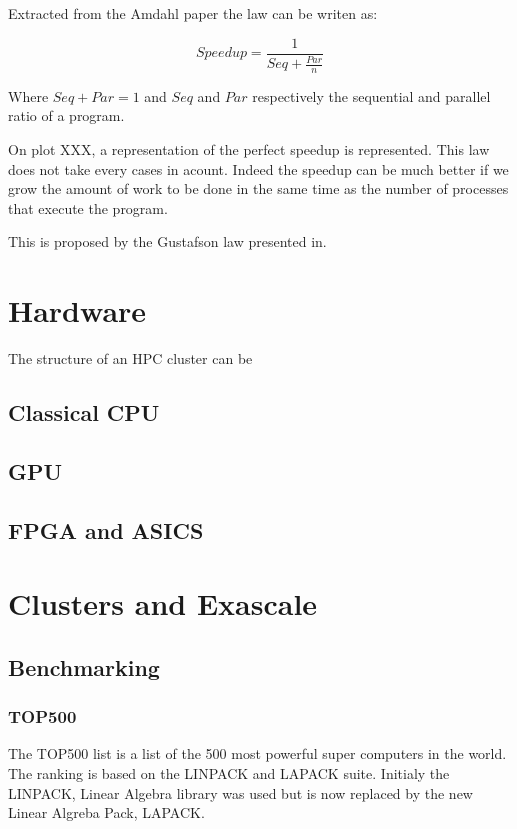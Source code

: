 Extracted from the Amdahl paper the law can be writen as: 

\begin{equation}
Speedup = \frac{1}{Seq + \frac{Par}{n}}
\end{equation}

Where $Seq + Par = 1$ and $Seq$ and $Par$ respectively the sequential and parallel ratio of a program. 

On plot XXX, a representation of the perfect speedup is represented.
This law does not take every cases in acount. 
Indeed the speedup can be much better if we grow the amount of work to be done in the same time as the number of processes that execute the program. 

This is proposed by the Gustafson law presented in. 

\section{Hardware}

The structure of an HPC cluster can be 

\subsection{Classical CPU}

\subsection{GPU}

\subsection{FPGA and ASICS}

\section{Clusters and Exascale}

\subsection{Benchmarking}

\subsubsection{TOP500}

The TOP500 list is a list of the 500 most powerful super computers in the world.
The ranking is based on the LINPACK and LAPACK suite. 
Initialy the LINPACK, Linear Algebra library was used but is now replaced by the new Linear Algreba Pack, LAPACK. 

